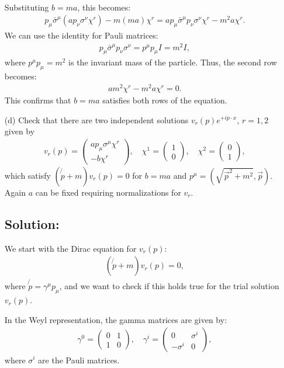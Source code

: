 \begin{enumerate}
\begin{align*}
    \end{align*}
    Substituting $b = ma$, this becomes:
    \begin{align*}
        p_\mu \bar{\sigma}^\mu (a p_\nu \sigma^\nu \chi^r) - m(ma) \chi^r = a p_\mu \bar{\sigma}^\mu p_\nu \sigma^\nu \chi^r - m^2 a \chi^r.
    \end{align*}
    We can use the identity for Pauli matrices:
    \begin{align*}
        p_\mu \bar{\sigma}^\mu p_\nu \sigma^\nu = p^\mu p_\mu I = m^2 I,
    \end{align*}
    where $p^\mu p_\mu = m^2$ is the invariant mass of the particle. Thus, the second row becomes:
    \begin{align}
        a m^2 \chi^r - m^2 a \chi^r = 0.
    \end{align}
    This confirms that $b = ma$ satisfies both rows of the equation.
    \bigskip\bigskip\hline\hline\bigskip
    \item[(d)] Check that there are two independent solutions $v_r(p)e^{+ip \cdot x}$, $r = 1, 2$ given by
    \begin{align}
    v_r(p) =
    \begin{pmatrix}
    a p_\mu \sigma^\mu \chi^r \\
    -b \chi^r
    \end{pmatrix}
    , \quad \chi^1 =
    \begin{pmatrix}
    1 \\
    0
    \end{pmatrix}
    , \quad \chi^2 =
    \begin{pmatrix}
    0 \\
    1
    \end{pmatrix}
    ,
    \end{align}
    which satisfy $(\not{p} + m)v_r(p) = 0$ for $b = ma$ and $p^\mu = (\sqrt{\vec{p}^2 + m^2}, \vec{p})$. Again $a$ can be fixed requiring normalizations for $v_r$.
    \bigskip\bigskip\hline\hline\bigskip
    \subsection*{Solution:} We start with the Dirac equation for $v_r(p)$:
    \begin{align}
        (\not{p} + m)v_r(p) = 0,
    \end{align}
    where $\not{p} = \gamma^\mu p_\mu$, and we want to check if this holds true for the trial solution $v_r(p)$.
    
    In the Weyl representation, the gamma matrices are given by:
    \begin{align*}
        \gamma^0 =
        \begin{pmatrix}
        0 & 1 \\
        1 & 0
        \end{pmatrix}
        ,\quad \gamma^i =
        \begin{pmatrix}
        0 & \sigma^i \\
        -\sigma^i & 0
        \end{pmatrix},
    \end{align*}
    where $\sigma^i$ are the Pauli matrices.
    

\end{enumerate}
